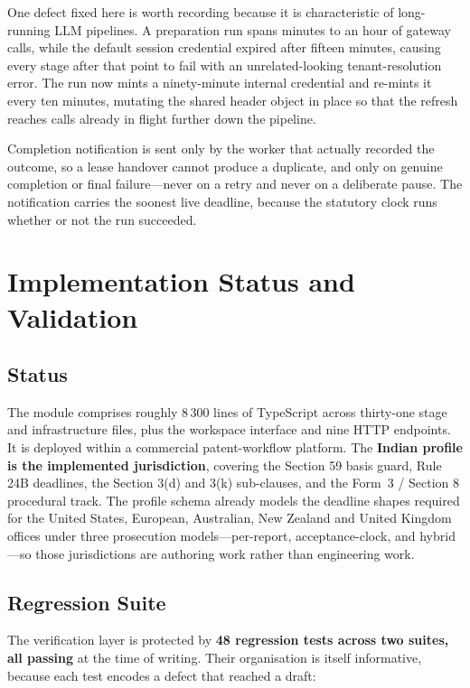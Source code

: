 \documentclass[conference]{IEEEtran}
\begin{document}
One defect fixed here is worth recording because it is characteristic of long-running LLM pipelines. A preparation run spans minutes to an hour of gateway calls, while the default session credential expired after fifteen minutes, causing every stage after that point to fail with an unrelated-looking tenant-resolution error. The run now mints a ninety-minute internal credential and re-mints it every ten minutes, mutating the shared header object in place so that the refresh reaches calls already in flight further down the pipeline.

Completion notification is sent only by the worker that actually recorded the outcome, so a lease handover cannot produce a duplicate, and only on genuine completion or final failure---never on a retry and never on a deliberate pause. The notification carries the soonest live deadline, because the statutory clock runs whether or not the run succeeded.

\section{Implementation Status and Validation}

\subsection{Status}

The module comprises roughly 8\,300 lines of TypeScript across thirty-one stage and infrastructure files, plus the workspace interface and nine HTTP endpoints. It is deployed within a commercial patent-workflow platform. The \textbf{Indian profile is the implemented jurisdiction}, covering the Section 59 basis guard, Rule 24B deadlines, the Section 3(d) and 3(k) sub-clauses, and the Form~3 / Section 8 procedural track. The profile schema already models the deadline shapes required for the United States, European, Australian, New Zealand and United Kingdom offices under three prosecution models---per-report, acceptance-clock, and hybrid---so those jurisdictions are authoring work rather than engineering work.

\subsection{Regression Suite}

The verification layer is protected by \textbf{48 regression tests across two suites, all passing} at the time of writing. Their organisation is itself informative, because each test encodes a defect that reached a draft:
\end{document}
